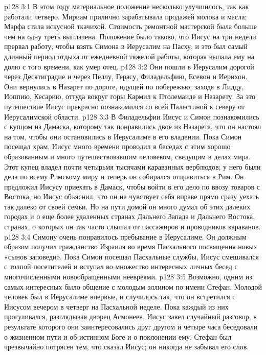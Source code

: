 \vs p128 3:1 В этом году материальное положение несколько улучшилось, так как работали четверо. Мириам прилично зарабатывала продажей молока и масла; Марфа стала искусной ткачихой. Стоимость ремонтной мастерской была больше чем на одну треть выплачена. Положение было таково, что Иисус на три недели прервал работу, чтобы взять Симона в Иерусалим на Пасху, и это был самый длинный период отдыха от ежедневной тяжелой работы, которая выпала ему на долю с того времени, как умер отец.
\vs p128 3:2 Они пошли в Иерусалим дорогой через Десятиградие и через Пеллу, Герасу, Филадельфию, Есевон и Иерихон. Они вернулись в Назарет по дороге, идущей по побережью, заходя в Лидду, Иоппию, Кесарию, оттуда вокруг горы Кармил к Птолемаиде и Назарету. За это путешествие Иисус прекрасно познакомился со всей Палестиной к северу от Иерусалимской области.
\vs p128 3:3 В Филадельфии Иисус и Симон познакомились с купцом из Дамаска, которому так понравились двое из Назарета, что он настоял на том, чтобы они остановились в Иерусалиме в его владении. Пока Симон посещал храм, Иисус много времени проводил в беседах с этим хорошо образованным и много путешествовавшим человеком, сведущим в делах мира. Этот купец владел почти четырьмя тысячами караванных верблюдов; у него были дела по всему Римскому миру и теперь он собирался отправиться в Рим. Он предложил Иисусу приехать в Дамаск, чтобы войти в его дело по ввозу товаров с Востока, но Иисус объяснил, что он не чувствует себя вправе прямо сразу уехать так далеко от своей семьи. Но на пути домой он много думал об этих далеких городах и о еще более удаленных странах Дальнего Запада и Дальнего Востока, странах, о которых он так часто слышал от пассажиров и проводников караванов.
\vs p128 3:4 Симону очень понравилось пребывание в Иерусалиме. Он должным образом получил гражданство Израиля во время Пасхального посвящения новых «сынов заповеди». Пока Симон посещал Пасхальные службы, Иисус смешивался с толпой посетителей и вступал во множество интересных личных бесед с многочисленными новообращенными неевреями.
\vs p128 3:5 Возможно, одним из самых интересных было общение с молодым эллином по имени Стефан. Молодой человек был в Иерусалиме впервые, и случилось так, что он встретился с Иисусом вечером в четверг на Пасхальной неделе. Пока каждый из них прогуливался, разглядывая дворец Асмонеев, Иисус завел случайный разговор, в результате которого они заинтересовались друг другом и четыре часа беседовали о жизненном пути и об истинном Боге и о поклонении ему. Стефан был чрезвычайно потрясен тем, что сказал Иисус; он никогда не забывал его слов.
